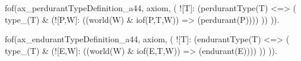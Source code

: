 
  





fof(ax_perdurantTypeDefinition_a44, axiom, (
  ![T]: (perdurantType(T) <=> (
    type_(T) & (![P,W]: ((world(W) & iof(P,T,W)) => (perdurant(P))))
  ))
)).

fof(ax_endurantTypeDefinition_a44, axiom, (
  ![T]: (endurantType(T) <=> (
    type_(T) & (![E,W]: ((world(W) & iof(E,T,W)) => (endurant(E))))
  ))
)).

